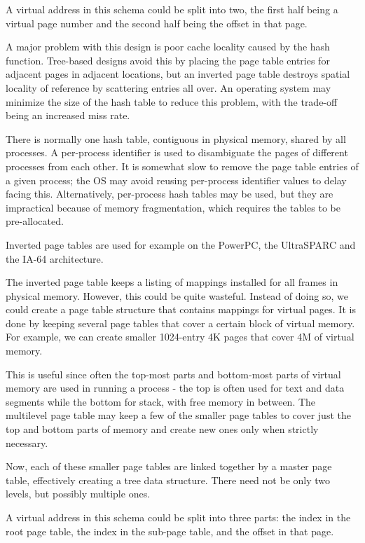 \documentclass{article}
\begin{document}
\begin{itemize}
A virtual address in this schema could be split into two, the first half being a virtual page number and the second half being the offset in that page.

A major problem with this design is poor cache locality caused by the hash function. Tree-based designs avoid this by placing the page table entries for adjacent pages in adjacent locations, but an inverted page table destroys spatial locality of reference by scattering entries all over. An operating system may minimize the size of the hash table to reduce this problem, with the trade-off being an increased miss rate.

There is normally one hash table, contiguous in physical memory, shared by all processes. A per-process identifier is used to disambiguate the pages of different processes from each other. It is somewhat slow to remove the page table entries of a given process; the OS may avoid reusing per-process identifier values to delay facing this. Alternatively, per-process hash tables may be used, but they are impractical because of memory fragmentation, which requires the tables to be pre-allocated.

Inverted page tables are used for example on the PowerPC, the UltraSPARC and the IA-64 architecture.

The inverted page table keeps a listing of mappings installed for all frames in physical memory. However, this could be quite wasteful. Instead of doing so, we could create a page table structure that contains mappings for virtual pages. It is done by keeping several page tables that cover a certain block of virtual memory. For example, we can create smaller 1024-entry 4K pages that cover 4M of virtual memory.

This is useful since often the top-most parts and bottom-most parts of virtual memory are used in running a process - the top is often used for text and data segments while the bottom for stack, with free memory in between. The multilevel page table may keep a few of the smaller page tables to cover just the top and bottom parts of memory and create new ones only when strictly necessary.

Now, each of these smaller page tables are linked together by a master page table, effectively creating a tree data structure. There need not be only two levels, but possibly multiple ones.

A virtual address in this schema could be split into three parts: the index in the root page table, the index in the sub-page table, and the offset in that page.


\end{itemize}
\end{document}
